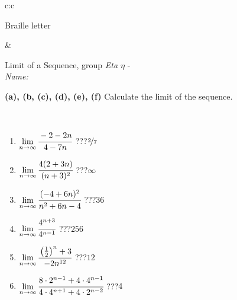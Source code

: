 \documentclass[10pt]{report}
\begin{document}
\begin{tabular}{c:c}
\begin{minipage}[c][104.5mm][t]{0.5\linewidth}
\begin{center}
\begin{minipage}{0.20\linewidth}
\begin{center}
{\small Braille letter}
\end{center}
\end{minipage}
\end{center}
\end{minipage}
&
\begin{minipage}[c][104.5mm][t]{0.5\linewidth}
\begin{center}
\vspace{5mm}
{\huge Limit of a Sequence, group \textit{Eta $\eta$} -}\\[5mm]
\textit{Name:}\phantom{xxxxxxxxxxxxxxxxxxxxxxxxxxxxxxxxxxxxxxxxxxxxxxxxxxxxxxxxxxxxxxxxx}\\[5mm]
\begin{minipage}{0.95\linewidth}
\begin{center}
{
\textbf{(a), (b, (c), (d), (e), (f)} Calculate the limit of the sequence. \\[-1mm]
\phantom{x}
}
\end{center}
\end{minipage}
\\[1mm]
\begin{minipage}{0.79\linewidth}
\begin{center}
\begin{varwidth}{\linewidth}
\setlength{\itemsep}{0pt}
\begin{enumerate}
\normalsize
\item $\lim\limits_{n\to\infty}\cfrac{-2-2n}{4-7n}$\quad \dotfill\; ???\;\dotfill \quad $\nicefrac{2}{7}$
\item $\lim\limits_{n\to\infty}\cfrac{4(2+3n)}{(n+3)^2}$\quad \dotfill\; ???\;\dotfill \quad $\infty$
\item $\lim\limits_{n\to\infty}\cfrac{(-4+6n)^2}{n^2+6n-4}$\quad \dotfill\; ???\;\dotfill \quad $36$
\item $\lim\limits_{n\to\infty}\cfrac{4^{n+3}}{4^{n-1}}$\quad \dotfill\; ???\;\dotfill \quad $256$
\item $\lim\limits_{n\to\infty}\cfrac{\left(\frac{1}{2}\right)^n +3}{-2n^{12}}$\quad \dotfill\; ???\;\dotfill \quad $12$
\item $\lim\limits_{n\to\infty}\cfrac{8\cdot 2^{n-1}+4\cdot 4^{n-1}}{4\cdot 4^{n+1}+4\cdot 2^{n-2}}$\quad \dotfill\; ???\;\dotfill \quad $4$
\end{enumerate}
\end{varwidth}
\end{center}
\end{minipage}
\begin{minipage}{0.20\linewidth}

\end{minipage}
\end{center}
\end{minipage}
\end{tabular}
\end{document}
